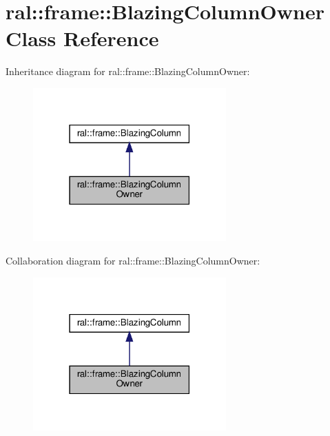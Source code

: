 \hypertarget{classral_1_1frame_1_1BlazingColumnOwner}{}\section{ral\+:\+:frame\+:\+:Blazing\+Column\+Owner Class Reference}
\label{classral_1_1frame_1_1BlazingColumnOwner}


Inheritance diagram for ral\+:\+:frame\+:\+:Blazing\+Column\+Owner\+:\nopagebreak
\begin{figure}[H]
\begin{center}
\leavevmode
\includegraphics[width=210pt]{classral_1_1frame_1_1BlazingColumnOwner__inherit__graph}
\end{center}
\end{figure}


Collaboration diagram for ral\+:\+:frame\+:\+:Blazing\+Column\+Owner\+:\nopagebreak
\begin{figure}[H]
\begin{center}
\leavevmode
\includegraphics[width=210pt]{classral_1_1frame_1_1BlazingColumnOwner__coll__graph}
\end{center}
\end{figure}

